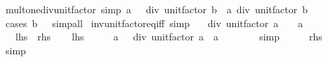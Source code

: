 \begin{isabellebody}
{\isafoldproof}%
%
\isadelimproof
\isanewline
%
\endisadelimproof
\isanewline
{}\isamarkupfalse%
\ mult{\isacharunderscore}{\kern0pt}one{\isacharunderscore}{\kern0pt}div{\isacharunderscore}{\kern0pt}unit{\isacharunderscore}{\kern0pt}factor\ {\isacharbrackleft}{\kern0pt}simp{\isacharbrackright}{\kern0pt}{\isacharcolon}{\kern0pt}\ {\isachardoublequoteopen}a\ {\isacharasterisk}{\kern0pt}\ {\isacharparenleft}{\kern0pt}{}\ div\ unit{\isacharunderscore}{\kern0pt}factor\ b{\isacharparenright}{\kern0pt}\ {\isacharequal}{\kern0pt}\ a\ div\ unit{\isacharunderscore}{\kern0pt}factor\ b{\isachardoublequoteclose}\isanewline
%
\isadelimproof
\ \ %
\endisadelimproof
%
\isatagproof
{}\isamarkupfalse%
\ {\isacharparenleft}{\kern0pt}cases\ {\isachardoublequoteopen}b\ {\isacharequal}{\kern0pt}\ {}{\isachardoublequoteclose}{\isacharparenright}{\kern0pt}\ simp{\isacharunderscore}{\kern0pt}all%
\endisatagproof
{\isafoldproof}%
%
\isadelimproof
\isanewline
%
\endisadelimproof
\isanewline
{}\isamarkupfalse%
\ inv{\isacharunderscore}{\kern0pt}unit{\isacharunderscore}{\kern0pt}factor{\isacharunderscore}{\kern0pt}eq{\isacharunderscore}{\kern0pt}{}{\isacharunderscore}{\kern0pt}iff\ {\isacharbrackleft}{\kern0pt}simp{\isacharbrackright}{\kern0pt}{\isacharcolon}{\kern0pt}\isanewline
\ \ {\isachardoublequoteopen}{}\ div\ unit{\isacharunderscore}{\kern0pt}factor\ a\ {\isacharequal}{\kern0pt}\ {}\ {\isasymlongleftrightarrow}\ a\ {\isacharequal}{\kern0pt}\ {}{\isachardoublequoteclose}\isanewline
\ \ {\isacharparenleft}{\kern0pt}\ {\isachardoublequoteopen}{\isacharquery}{\kern0pt}lhs\ {\isasymlongleftrightarrow}\ {\isacharquery}{\kern0pt}rhs{\isachardoublequoteclose}{\isacharparenright}{\kern0pt}\isanewline
%
\isadelimproof
%
\endisadelimproof
%
\isatagproof
{}\isamarkupfalse%
\isanewline
\ \ \isamarkupfalse%
\ {\isacharquery}{\kern0pt}lhs\isanewline
\ \ \isamarkupfalse%
\ \isamarkupfalse%
\ {\isachardoublequoteopen}a\ {\isacharasterisk}{\kern0pt}\ {\isacharparenleft}{\kern0pt}{}\ div\ unit{\isacharunderscore}{\kern0pt}factor\ a{\isacharparenright}{\kern0pt}\ {\isacharequal}{\kern0pt}\ a\ {\isacharasterisk}{\kern0pt}\ {}{\isachardoublequoteclose}\isanewline
\ \ \ \ \isamarkupfalse%
\ simp\isanewline
\ \ \isamarkupfalse%
\ \isamarkupfalse%
\ {\isacharquery}{\kern0pt}rhs\isanewline
\ \ \ \ \isamarkupfalse%
\ simp\isanewline

\end{isabellebody}
